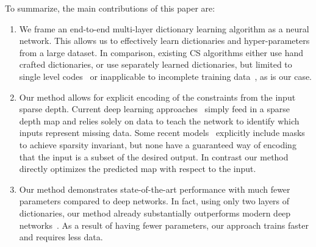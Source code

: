   
  To summarize, the main contributions of this paper are:
  \begin{enumerate}
    \item We frame an end-to-end multi-layer dictionary learning algorithm as a neural network. This allows us to effectively learn dictionaries and hyper-parameters from a large dataset. In comparison, existing CS algorithms either use hand crafted dictionaries, or use separately learned dictionaries, but limited to single level codes~\cite{} or inapplicable to incomplete training data~\cite{}, as is our case.

  
  \item Our method allows for explicit encoding of the constraints from the input sparse depth. Current deep learning approaches~\cite{} simply feed in a sparse depth map and relies solely on data to teach the network to identify which inputs represent missing data. Some recent models~\cite{} explicitly include masks to achieve sparsity invariant, but none have a guaranteed way of encoding that the input is a subset of the desired output. In contrast our method directly optimizes the predicted map with respect to the input.
  
      
  \item Our method demonstrates state-of-the-art performance with much fewer parameters compared to deep networks. In fact,  using only two layers of dictionaries, our method already substantially outperforms modern deep networks~\cite{}. As a result of having fewer parameters, our approach trains faster and requires less data.
  
  \end{enumerate}
